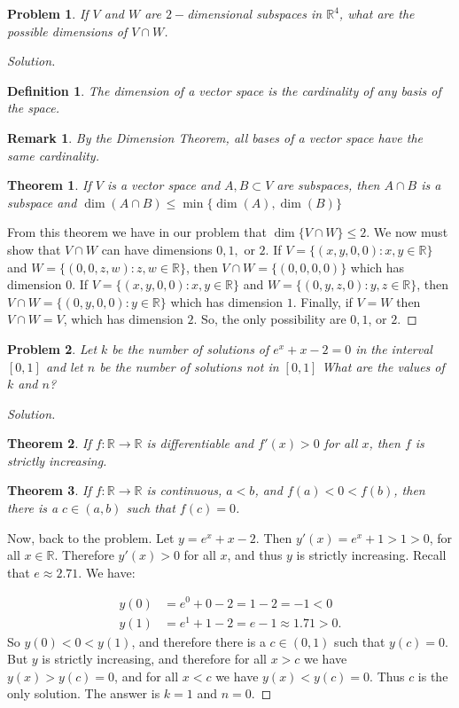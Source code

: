 \documentclass[12pt,oneside]{book}
\theoremstyle{mystyle}
\newtheorem{problem}{Problem}[section]
\newtheorem*{theorem*}{Theorem}
\newtheorem*{definition*}{Definition}
\newtheorem*{remark*}{Remark}
\begin{document}
\begin{problem}
If $V$ and $W$ are $2-$dimensional subspaces in $\mathbb{R}^4$, what are the possible dimensions of $V\cap W$.
\end{problem}
\begin{proof}[Solution]
\begin{definition*}
The dimension of a vector space is the cardinality of any basis of the space. 
\end{definition*}
\begin{remark*}
By the Dimension Theorem, all bases of a vector space have the same cardinality.
\end{remark*}
\begin{theorem*}
If $V$ is a vector space and $A,B\subset V$ are subspaces, then $A\cap B$ is a subspace and $\dim(A\cap B) \leq \min\{\dim(A),\dim(B)\}$
\end{theorem*}
From this theorem we have in our problem that $\dim\{V\cap W\} \leq 2$. We now must show that $V\cap W$ can have dimensions $0,1,$ or $2$. If $V = \{(x,y,0,0):x,y\in \mathbb{R}\}$ and $W = \{(0,0,z,w):z,w\in \mathbb{R}\}$, then $V\cap W = \{(0,0,0,0)\}$ which has dimension $0$. If $V = \{(x,y,0,0):x,y\in \mathbb{R}\}$ and $W = \{(0,y,z,0):y,z\in \mathbb{R}\}$, then $V\cap W = \{(0,y,0,0):y\in \mathbb{R}\}$ which has dimension $1$. Finally, if $V=W$ then $V\cap W = V$, which has dimension $2$. So, the only possibility are $0,1$, or $2$.
\end{proof}

\begin{problem}
Let $k$ be the number of solutions of $e^x+x-2 = 0$ in the interval $[0,1]$ and let $n$ be the number of solutions not in $[0,1]$ What are the values of $k$ and $n$?
\end{problem}
\begin{proof}[Solution]
\begin{theorem*}
If $f:\mathbb{R}\rightarrow \mathbb{R}$ is differentiable and $f'(x) >0$ for all $x$, then $f$ is strictly increasing.
\end{theorem*}
\begin{theorem*}
If $f:\mathbb{R}\rightarrow \mathbb{R}$ is continuous, $a<b$, and $f(a)<0<f(b)$, then there is a $c\in (a,b)$ such that $f(c) = 0$.
\end{theorem*}
Now, back to the problem. Let $y=e^x+x-2$. Then $y'(x) = e^x+1 > 1 > 0$, for all $x\in \mathbb{R}$. Therefore $y'(x)>0$ for all $x$, and thus $y$ is strictly increasing. Recall that $e\approx 2.71$. We have:

\begin{align}
    \nonumber y(0) &= e^0 + 0 - 2 = 1-2 = -1 <0 \\
    \nonumber y(1) &= e^1+1-2 = e-1 \approx 1.71 > 0.
\end{align}
So $y(0)<0<y(1)$, and therefore there is a $c\in (0,1)$ such that $y(c) = 0$. But $y$ is strictly increasing, and therefore for all $x>c$ we have $y(x)>y(c) = 0$, and for all $x<c$ we have $y(x)<y(c) = 0$. Thus $c$ is the only solution. The answer is $k=1$ and $n=0$.
\end{proof}
\end{document}
